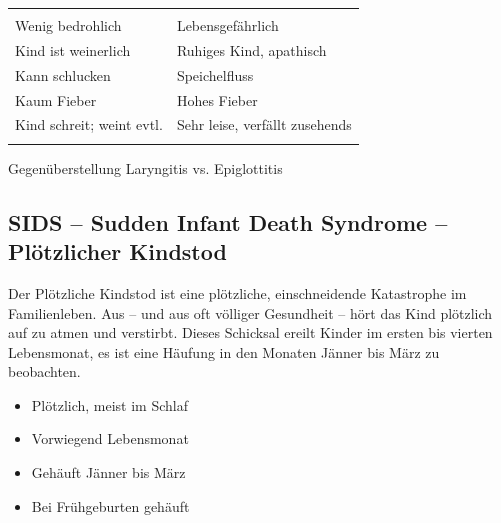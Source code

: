 \bigskip

{}
{}
{}
{%
\begin{tabulary}{\linewidth}{LL}
\toprule\addlinespace
\noindent{}
&
\noindent{}
\\\addlinespace\midrule\addlinespace
Wenig bedrohlich
&
Lebensgefährlich
\\\addlinespace
Kind ist weinerlich
&
Ruhiges Kind, apathisch
\\\addlinespace
Kann schlucken
&
Speichelfluss
\\\addlinespace
Kaum Fieber
&
Hohes Fieber
\\\addlinespace
Kind schreit; weint evtl.
&
Sehr leise, verfällt zusehends
\\\addlinespace\bottomrule
\end{tabulary}
}
{Gegenüberstellung Laryngitis vs. Epiglottitis}
{}

 
 
\subsection{SIDS -- Sudden Infant Death Syndrome -- Plötzlicher Kindstod}
\label{topic:sids}

{%
Der Plötzliche Kindstod  ist eine plötzliche, einschneidende
Katastrophe im Familienleben. Aus 
-- und aus oft völliger Gesundheit -- hört das Kind
plötzlich auf zu atmen und verstirbt.
Dieses Schicksal ereilt Kinder im ersten bis vierten
Lebensmonat, es ist eine Häufung in den Monaten Jänner bis
März zu beobachten.

}{
\begin{itemize}
    \item Plötzlich, meist im Schlaf
    \item Vorwiegend  Lebensmonat
    \item Gehäuft Jänner bis März
    \item Bei Frühgeburten gehäuft
\end{itemize}
}{}{}{}


